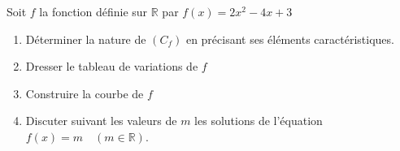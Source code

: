 \begin{Application}[][10 min]
Soit $f$ la fonction définie sur $\mathbb{R}$ par $f(x) = 2x^2 - 4x + 3$
\begin{enumerate}
    \item Déterminer la nature de $(C_f)$ en précisant ses éléments caractéristiques. 
    \item Dresser le tableau de variations de $f$ 
    \item Construire la courbe de $f$ 
    \item Discuter suivant les valeurs de $m$ les solutions de l'équation $f(x) = m \quad (m \in \mathbb{R})$.
\end{enumerate}
 

\end{Application}
